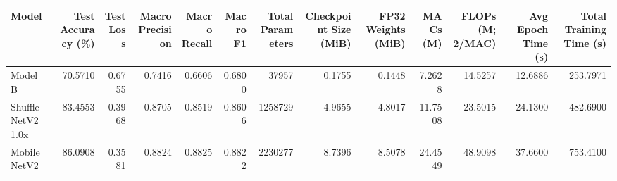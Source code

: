 \begin{tabular}{lrrrrrrrrrrrr}
\toprule
Model & Test Accuracy (\%) & Test Loss & Macro Precision & Macro Recall & Macro F1 & Total Parameters & Checkpoint Size (MiB) & FP32 Weights (MiB) & MACs (M) & FLOPs (M; 2/MAC) & Avg Epoch Time (s) & Total Training Time (s) \\
\midrule
Model B & 70.5710 & 0.6755 & 0.7416 & 0.6606 & 0.6800 & 37957 & 0.1755 & 0.1448 & 7.2628 & 14.5257 & 12.6886 & 253.7971 \\
ShuffleNetV2 1.0x & 83.4553 & 0.3968 & 0.8705 & 0.8519 & 0.8606 & 1258729 & 4.9655 & 4.8017 & 11.7508 & 23.5015 & 24.1300 & 482.6900 \\
MobileNetV2 & 86.0908 & 0.3581 & 0.8824 & 0.8825 & 0.8822 & 2230277 & 8.7396 & 8.5078 & 24.4549 & 48.9098 & 37.6600 & 753.4100 \\
\bottomrule
\end{tabular}
